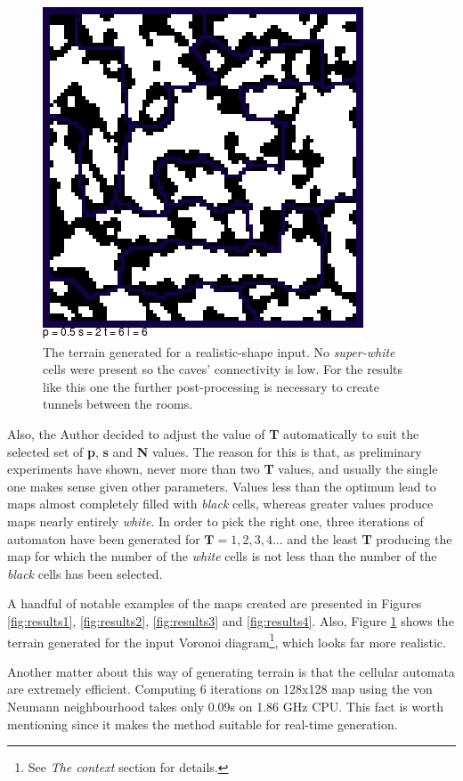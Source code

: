 \documentclass[a4paper, 11pt]{article} %
\begin{document}
\begin{figure}
	\centering
	\includegraphics[scale=0.5]{voronoi}
	\caption{The terrain generated for a realistic-shape input. No \emph{super-white} cells were present so the caves' connectivity is low. For the results like this one the further post-processing is necessary to create tunnels between the rooms.}
	\label{fig:voronoi}
\end{figure}

Also, the Author decided to adjust the value of \textbf{T} automatically to suit the selected set of \textbf{p}, \textbf{s} and \textbf{N} values. The reason for this is that, as preliminary experiments have shown, never more than two \textbf{T} values, and usually the single one makes sense given other parameters. Values less than the optimum lead to maps almost completely filled with \emph{black} cells, whereas greater values produce maps nearly entirely \emph{white}. In order to pick the right one, three iterations of automaton have been generated for $\textbf{T} = 1,2,3,4...$ and the least \textbf{T} producing the map for which the number of the \emph{white} cells is not less than the number of the \emph{black} cells has been selected.

A handful of notable examples of the maps created are presented in Figures \ref{fig:results1}, \ref{fig:results2}, \ref{fig:results3} and \ref{fig:results4}. Also, Figure \ref{fig:voronoi} shows the terrain generated for the input Voronoi diagram\footnote{See \emph{The context} section for details.}, which looks far more realistic.

Another matter about this way of generating terrain is that the cellular automata are extremely efficient. Computing 6 iterations on 128x128 map using the von Neumann neighbourhood takes only 0.09s on 1.86 GHz CPU. This fact is worth mentioning since it makes the method suitable for real-time generation. 
\end{document}
